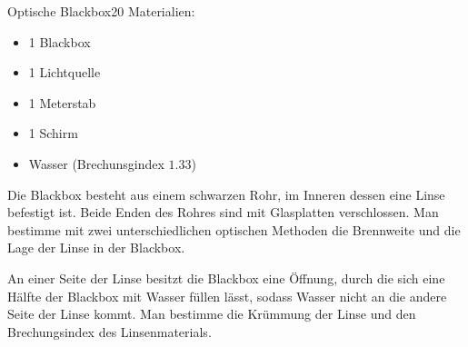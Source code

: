 \begin{problem}{Optische Blackbox}{20}
Materialien:
\begin{itemize}
\item 1 Blackbox
\item 1 Lichtquelle
\item 1 Meterstab
\item 1 Schirm
\item Wasser (Brechunsgindex $1.33$)
\end{itemize}
\begin{abcenum}
\item Die Blackbox besteht aus einem schwarzen Rohr, im Inneren dessen eine Linse befestigt ist. Beide Enden des Rohres sind mit Glasplatten verschlossen. Man bestimme mit zwei unterschiedlichen optischen Methoden die Brennweite und die Lage der Linse in der Blackbox.
\item An einer Seite der Linse besitzt die Blackbox eine Öffnung, durch die sich eine Hälfte der Blackbox mit Wasser füllen lässt, sodass Wasser nicht an die andere Seite der Linse kommt. Man bestimme die Krümmung der Linse und den Brechungsindex des Linsenmaterials.
\end{abcenum}


\end{problem}
